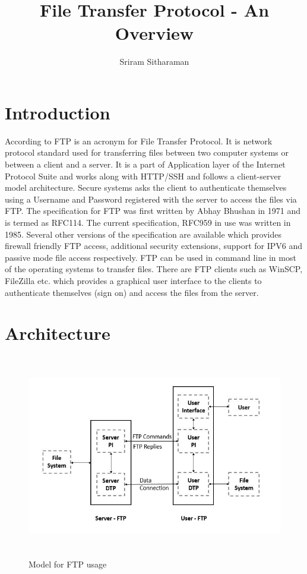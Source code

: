 \documentclass[9pt,twocolumn,twoside]{styles/osajnl}
\title{File Transfer Protocol - An Overview}
\author[1,*]{Sriram Sitharaman}
\affil[1]{School of Informatics and Computing, Bloomington, IN 47408, U.S.A.}
\affil[*]{Corresponding authors: srirsith@iu.edu}
\begin{document}
\maketitle
\tableofcontents %
\section{Introduction}
According to \cite{www-wiki-ftp} FTP is an acronym for File Transfer Protocol. It is network protocol standard used for transferring files between two computer systems or between a client and a server. It is a part of Application layer of the Internet Protocol Suite and works along with HTTP/SSH and follows a client-server model architecture. Secure systems asks the client to authenticate themselves using a Username and Password registered with the server to access the files via FTP. The specification for FTP was first written by  Abhay Bhushan \cite{www-rfc114} in 1971 and is termed as RFC114. The current specification, RFC959 in use was written in 1985. Several other versions of the specification are available which provides firewall friendly FTP access, additional security extensions, support for IPV6 and passive mode file access respectively. FTP can be used in command line in most of the operating systems to transfer files. There are FTP clients such as WinSCP, FileZilla etc. which provides a graphical user interface to the clients to authenticate themselves (sign on) and access the files from the server.


\section{Architecture}

\begin{figure}[hbt]
\begin{center}
\centering
\includegraphics[width =6in ,height=3.5in]{images/Architecture}
\caption{Model for FTP usage \cite{www-rfc959}}
\label{fig:arch}
\end{center}
\end{figure}
\end{document}
